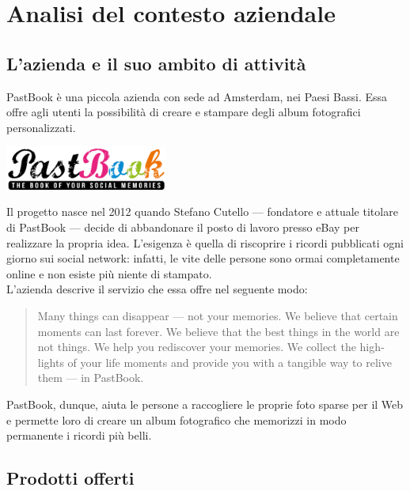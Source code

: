\chapter{Analisi del contesto aziendale}
	\section{L'azienda e il suo ambito di attività}
		PastBook è una piccola azienda con sede ad Amsterdam, nei Paesi Bassi. Essa offre agli utenti la possibilità di creare e stampare
		degli album fotografici personalizzati.
		\begin{center}
			\includegraphics[width=0.4\textwidth]{capitolo_1/immagini/logo_pastbook.png}
		\end{center}
		Il progetto nasce nel 2012 quando Stefano Cutello — fondatore e attuale titolare di PastBook — decide di abbandonare il posto di
		lavoro presso eBay per realizzare la propria idea. L'esigenza è quella di riscoprire i ricordi pubblicati ogni giorno sui social
		network: infatti, le vite delle persone sono ormai completamente online e non esiste più niente di stampato.\\
		L'azienda descrive il servizio che essa offre nel seguente modo:
		\hyphenblockquote{english}{Many things can disappear — not your memories. We believe that certain moments can last forever. We
			believe that the best things in the world are not things. We help you rediscover your memories. We collect the highlights of
			your life moments and provide you with a tangible way to relive them — in PastBook.}
		PastBook, dunque, aiuta le persone a raccogliere le proprie foto sparse per il Web e permette loro di creare un album fotografico
		che memorizzi in modo permanente i ricordi più belli.
	\section{Prodotti offerti}
